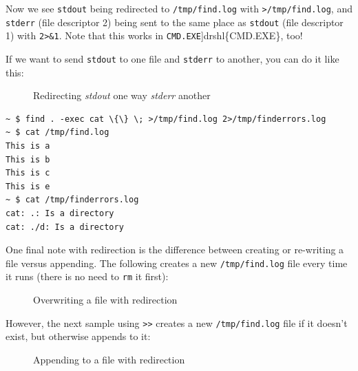 \documentclass[10pt,american,]{book}
\newenvironment{Shaded}{\begin{snugshade}}{\end{snugshade}}
\newcommand{\KeywordTok}[1]{\textcolor[rgb]{0.13,0.29,0.53}{\textbf{{#1}}}}
\newcommand{\DataTypeTok}[1]{\textcolor[rgb]{0.13,0.29,0.53}{{#1}}}
\newcommand{\NormalTok}[1]{{#1}}
\numberwithin{figure}{chapter}
\DeclareRobustCommand{\drcap}[1]{\begin{figure}[H]\caption{#1}\end{figure}}
\renewcommand{\KeywordTok}[1]{{#1}}
\renewcommand{\DataTypeTok}[1]{{#1}}
\renewcommand{\NormalTok}[1]{{#1}}
\begin{document}
Now we see \texttt{stdout} being redirected to \texttt{/tmp/find.log}
with \texttt{\textgreater{}/tmp/find.log}, and \texttt{stderr} (file
descriptor 2) being sent to the same place as \texttt{stdout} (file
descriptor 1) with \texttt{2\textgreater{}\&1}. Note that this works in
\texttt{CMD.EXE}{]}drshl\{CMD.EXE\}, too!

If we want to send \texttt{stdout} to one file and \texttt{stderr} to
another, you can do it like this:

\drcap{Redirecting \textit{stdout} one way \textit{stderr} another}

\begin{verbatim}
~ $ find . -exec cat \{\} \; >/tmp/find.log 2>/tmp/finderrors.log
~ $ cat /tmp/find.log
This is a
This is b
This is c
This is e
~ $ cat /tmp/finderrors.log
cat: .: Is a directory
cat: ./d: Is a directory
\end{verbatim}

One final note with redirection is the difference between creating or
re-writing a file versus appending. The following creates a new
\texttt{/tmp/find.log} file every time it runs (there is no need to
\texttt{rm} it first):

\drcap{Overwriting a file with redirection}

\begin{Shaded}
\end{Shaded}

However, the next sample using
\texttt{\textgreater{}\textgreater{}}
 creates a new
\texttt{/tmp/find.log} file if it doesn't exist, but otherwise appends
to it:

\drcap{Appending to a file with redirection}

\begin{Shaded}
\end{Shaded}
\end{document}

